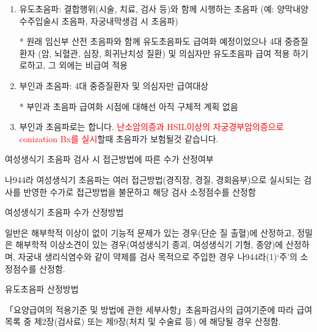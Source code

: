 \prezi{\clearpage}
\begin{mdframed}[linecolor=red,middlelinewidth=2]  
\begin{enumerate}\tightlist
\item 유도초음파: 결합행위(시술, 치료, 검사 등)와 함께 시행하는 초음파 (예: 양막내양수주입술시 초음파, 자궁내막생검 시 초음파)\par
* 원래 임신부 산전 초음파와 함께 유도초음파도 급여화 예정이었으나 4대 중증질환자 (암, 뇌혈관, 심장, 희귀난치성 질환) 및 의심자만 유도초음파 급여 적용 하기로하고, 그 외에는 비급여 적용
\item 부인과 초음파: 4대 중증질환자 및 의심자만 급여대상 \par
* 부인과 초음파 급여화 시점에 대해선 아직 구체적 계획 없음
\item 부인과 초음파로는 합니다.  \textcolor{red}{난소암의증과 HSIL이상의 자궁경부암의증으로 conization Bx를 실시}할때 초음파가 보험될것 같습니다.
\end{enumerate}
\end{mdframed}
\prezi{\clearpage}
\medskip
\textsf{여성생식기 초음파 검사 시 접근방법에 따른 수가 산정여부}
\begin{commentbox}{}
나944라 여성생식기 초음파는 여러 접근방법(경직장, 경질, 경회음부)으로 실시되는 검사를 반영한 수가로 접근방법을 불문하고 해당 검사 소정점수를 산정함
\end{commentbox}
\prezi{\clearpage}
\textsf{여성생식기 초음파 수가 산정방법}
\begin{commentbox}{}
일반은 해부학적 이상이 없이 기능적 문제가 있는 경우(단순 질 출혈)에 산정하고, 정밀은 해부학적 이상소견이 있는 경우(여성생식기 종괴, 여성생식기 기형, 종양)에 산정하며, 자궁내 생리식염수와 같이 약제를 검사 목적으로 주입한 경우 나944라(1)‘주’의 소정점수를 산정함.
\end{commentbox}
\prezi{\clearpage}
\textsf{유도초음파 산정방법}
\begin{commentbox}{}
「요양급여의 적용기준 및 방법에 관한 세부사항」초음파검사의 급여기준에 따라 급여목록 중 제2장(검사료) 또는 제9장(처치 및 수술료 등) 에 해당될 경우 산정함.
\end{commentbox}

